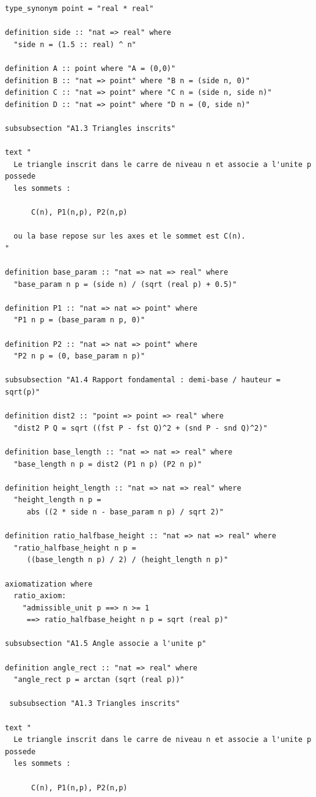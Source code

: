 \documentclass[12pt,a4paper]{article}
\theoremstyle{definition}
\theoremstyle{remark}
\begin{document}
\begin{verbatim}
type_synonym point = "real * real"

definition side :: "nat => real" where
  "side n = (1.5 :: real) ^ n"

definition A :: point where "A = (0,0)"
definition B :: "nat => point" where "B n = (side n, 0)"
definition C :: "nat => point" where "C n = (side n, side n)"
definition D :: "nat => point" where "D n = (0, side n)"

subsubsection "A1.3 Triangles inscrits"

text "
  Le triangle inscrit dans le carre de niveau n et associe a l'unite p possede
  les sommets :

      C(n), P1(n,p), P2(n,p)

  ou la base repose sur les axes et le sommet est C(n).
"

definition base_param :: "nat => nat => real" where
  "base_param n p = (side n) / (sqrt (real p) + 0.5)"

definition P1 :: "nat => nat => point" where
  "P1 n p = (base_param n p, 0)"

definition P2 :: "nat => nat => point" where
  "P2 n p = (0, base_param n p)"

subsubsection "A1.4 Rapport fondamental : demi-base / hauteur = sqrt(p)"

definition dist2 :: "point => point => real" where
  "dist2 P Q = sqrt ((fst P - fst Q)^2 + (snd P - snd Q)^2)"

definition base_length :: "nat => nat => real" where
  "base_length n p = dist2 (P1 n p) (P2 n p)"

definition height_length :: "nat => nat => real" where
  "height_length n p =
     abs ((2 * side n - base_param n p) / sqrt 2)"

definition ratio_halfbase_height :: "nat => nat => real" where
  "ratio_halfbase_height n p =
     ((base_length n p) / 2) / (height_length n p)"

axiomatization where
  ratio_axiom:
    "admissible_unit p ==> n >= 1
     ==> ratio_halfbase_height n p = sqrt (real p)"

subsubsection "A1.5 Angle associe a l'unite p"

definition angle_rect :: "nat => real" where
  "angle_rect p = arctan (sqrt (real p))"

 subsubsection "A1.3 Triangles inscrits"

text "
  Le triangle inscrit dans le carre de niveau n et associe a l'unite p possede
  les sommets :

      C(n), P1(n,p), P2(n,p)


\end{verbatim}
\end{document}
